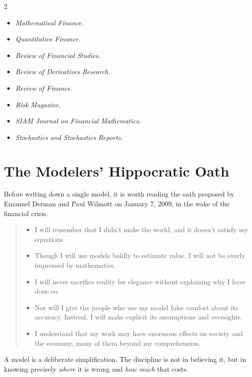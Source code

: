 \begin{multicols}{2}
\begin{itemize}[nosep, font=\normalfont, label=\textcolor{Gray}{\textbullet}]
		\item \emph{Mathematical Finance.}
		\item \emph{Quantitative Finance.}
		\item \emph{Review of Financial Studies.}
		\item \emph{Review of Derivatives Research.}
		\item \emph{Review of Finance.}
		\item \emph{Risk Magazine.}
		\item \emph{SIAM Journal on Financial Mathematics.}
		\item \emph{Stochastics and Stochastics Reports.}
	\end{itemize}
\end{multicols}

\section{The Modelers' Hippocratic Oath}
\label{sec:oath}


Before writing down a single model, it is worth reading the oath proposed by Emanuel Derman and Paul Wilmott on January 7, 2009, in the wake of the financial crisis.

\begin{quote}
	\begin{itemize}[itemsep=0.3em, leftmargin=1em]
		\item I will remember that I didn't make the world, and it doesn't satisfy my
		      equations.
		\item Though I will use models boldly to estimate value, I will not be overly
		      impressed by mathematics.
		\item I will never sacrifice reality for elegance without explaining why I have
		      done so.
		\item Nor will I give the people who use my model false comfort about its
		      accuracy. Instead, I will make explicit its assumptions and oversights.
		\item I understand that my work may have enormous effects on society and the
		      economy, many of them beyond my comprehension.
	\end{itemize}
\end{quote}

\suppstart
\begin{intuition}
	A model is a deliberate simplification.
	The discipline is not in believing it, but in knowing precisely \emph{where} it is wrong and \emph{how much} that costs.
\end{intuition}
\suppend

